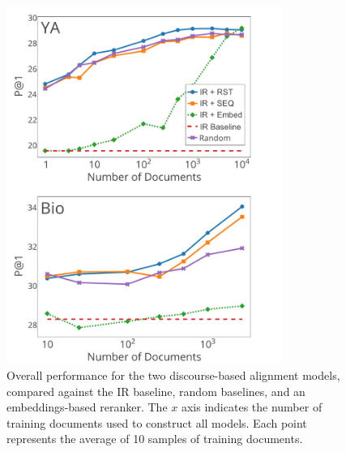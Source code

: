 \begin{figure}[t!]
\begin{center}
\includegraphics[width=90mm]{mainmatter/naacl2015-alignment/graphs_new2.pdf}
\caption{{\small Overall performance for the two discourse-based alignment models,
compared against the IR baseline, random baselines, and an embeddings-based reranker.
The $x$ axis indicates the number of training documents used to construct all models. 
Each point represents the average of 10 samples of training documents.  }}
\label{fig:performance}
\end{center}
\end{figure}


